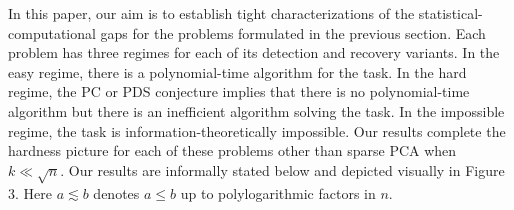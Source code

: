 \documentclass[11pt]{article}
\begin{document}

In this paper, our aim is to establish tight characterizations of the statistical-computational gaps for the problems formulated in the previous section. Each problem has three regimes for each of its detection and recovery variants. In the easy regime, there is a polynomial-time algorithm for the task. In the hard regime, the PC or PDS conjecture implies that there is no polynomial-time algorithm but there is an inefficient algorithm solving the task. In the impossible regime, the task is information-theoretically impossible. Our results complete the hardness picture for each of these problems other than sparse PCA when $k \ll \sqrt{n}$. Our results are informally stated below and depicted visually in Figure 3. Here $a \lesssim b$ denotes $a \le b$ up to polylogarithmic factors in $n$.
\end{document}
